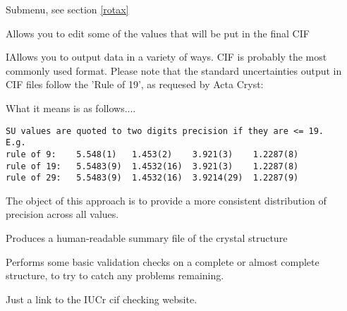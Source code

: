 \documentclass[10pt,a4paper]{report}
\begin{document}
\bigskip{}




Submenu, see section \ref{rotax}



\bigskip{}




Allows you to edit some of the values that will be put in the final CIF






\bigskip{}




IAllows you to output data in a variety of ways. CIF is probably the most
commonly used format. Please note that the standard uncertainties output
in CIF files follow the 'Rule of 19', as requesed by Acta Cryst:


 What it means is as follows....
\small\begin{verbatim}
SU values are quoted to two digits precision if they are <= 19.
E.g.
rule of 9:    5.548(1)   1.453(2)    3.921(3)    1.2287(8)
rule of 19:   5.5483(9)  1.4532(16)  3.921(3)    1.2287(8)
rule of 29:   5.5483(9)  1.4532(16)  3.9214(29)  1.2287(9)
\end{verbatim}\normalsize




The object of this approach is to provide a more consistent distribution
of precision across all values. 



\bigskip{}




Produces a human-readable summary file of the crystal structure





\bigskip{}




Performs some basic validation checks on a complete or almost complete
structure, to try to catch any problems remaining.





\bigskip{}




Just a link to the IUCr cif checking website.





\bigskip{}
\end{document}
